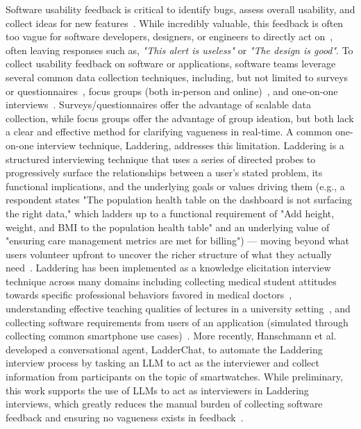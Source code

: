 \documentclass[sigconf,authordraft]{acmart}
\begin{document}
Software usability feedback is critical to identify bugs, assess overall usability, and collect ideas for new features~\cite{abedini_hybrid_2025, maalej_automated_2024}. While incredibly valuable, this feedback is often too vague for software developers, designers, or engineers to directly act on~\cite{folstad_users_2017, yusop_reporting_2017, galavi_online_2023}, often leaving responses such as, \textit{"This alert is useless"} or \textit{"The design is good"}. To collect usability feedback on software or applications, software teams leverage several common data collection techniques, including, but not limited to surveys or questionnaires~\cite{brooke_sus_1996}, focus groups (both in-person and online)~\cite{kontio_using_2004, galavi_online_2023}, and one-on-one interviews~\cite{rietz_ladderbot_2019, folstad_ladderchat_2025, maramba_methods_2019}. Surveys/questionnaires offer the advantage of scalable data collection, while focus groups offer the advantage of group ideation, but both lack a clear and effective method for clarifying vagueness in real-time. A common one-on-one interview technique, Laddering, addresses this limitation. Laddering is a structured interviewing technique that uses a series of directed probes to progressively surface the relationships between a user's stated problem, its functional implications, and the underlying goals or values driving them (e.g., a respondent states "The population health table on the dashboard is not surfacing the right data," which ladders up to a functional requirement of "Add height, weight, and BMI to the population health table" and an underlying value of "ensuring care management metrics are met for billing") — moving beyond what users volunteer upfront to uncover the richer structure of what they actually need~\cite{rugg_laddering_1995, reynolds_laddering_1988, corbridge_laddering_1994}. Laddering has been implemented as a knowledge elicitation interview technique across many domains including collecting medical student attitudes towards specific professional behaviors favored in medical doctors~\cite{miles_identifying_2010}, understanding effective teaching qualities of lectures in a university setting~\cite{voss_service_2007}, and collecting software requirements from users of an application (simulated through collecting common smartphone use cases)~\cite{rietz_ladderbot_2019}. More recently, Hanschmann et al.~\cite{folstad_ladderchat_2025} developed a conversational agent, LadderChat, to automate the Laddering interview process by tasking an LLM to act as the interviewer and collect information from participants on the topic of smartwatches. While preliminary, this work supports the use of LLMs to act as interviewers in Laddering interviews, which greatly reduces the manual burden of collecting software feedback and ensuring no vagueness exists in feedback~\cite{hamalainen_evaluating_2023, argyle_out_2023}. 
\end{document}
